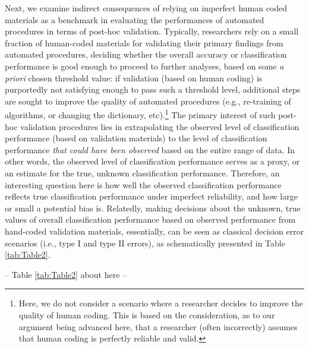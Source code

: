 \documentclass[man, 12pt, a4paper, nolmodern, noextraspace]{apa6}
\begin{document}
Next, we examine indirect consequences of relying on imperfect human coded materials as a benchmark in evaluating the performances of automated procedures in terms of post-hoc validation. Typically, researchers rely on a small fraction of human-coded materials for validating their primary findings from automated procedures, deciding whether the overall accuracy or classification performance is good enough to proceed to further analyses, based on some \textit{a priori} chosen threshold value: if validation (based on human coding) is purportedly not satisfying enough to pass such a threshold level, additional steps are sought to improve the quality of automated procedures (e.g., re-training of algorithms, or changing the dictionary, etc).\footnote{Here, we do not consider a scenario where a researcher decides to improve the quality of human coding. This is based on the consideration, as to our argument being advanced here, that a researcher (often incorrectly) assumes that human coding is perfectly reliable and valid.} The primary interest of such post-hoc validation procedures lies in extrapolating the observed level of classification performance (based on validation materials) to the level of classification performance \textit{that could have been observed} based on the entire range of data. In other words, the observed level of classification performance serves as a proxy, or an estimate for the true, unknown classification performance. Therefore, an interesting question here is how well the observed classification performance reflects true classification performance under imperfect reliability, and how large or small a potential bias is. Relatedly, making decisions about the unknown, true values of overall classification performance based on observed performance from hand-coded validation materials, essentially, can be seen as classical decision error scenarios (i.e., type I and type II errors), as schematically presented in Table \ref{tab:Table2}.
\centerline{ -- Table \ref{tab:Table2} about here -- }    
\end{document}
